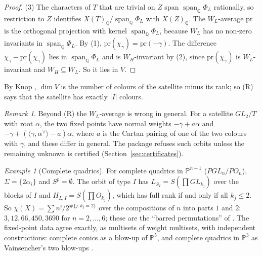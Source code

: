\documentclass[11pt]{amsart}
\theoremstyle{definition}
\theoremstyle{remark}
\newtheorem{remark}[theorem]{Remark}
\newtheorem{example}[theorem]{Example}
\newcommand{\PP}{\mathbb{P}}
\newcommand{\QQ}{\mathbb{Q}}
\newcommand{\pr}{\mathrm{pr}}
\begin{document}
\begin{proof}
(3) The characters of $T$ that are trivial on $Z$ span
$\operatorname{span}_\QQ\Phi_L$ rationally, so restriction to $Z$ identifies
$X(T)_\QQ/\operatorname{span}_\QQ\Phi_L$ with $X(Z)_\QQ$. The $W_L$-average
$\pr$ is the orthogonal projection with kernel $\operatorname{span}_\QQ\Phi_L$,
because $W_L$ has no non-zero invariants in $\operatorname{span}_\QQ\Phi_L$.
By (1), $\pr(\chi_\gamma)=\pr(-\gamma)$. The difference
$\chi_\gamma-\pr(\chi_\gamma)$ lies in $\operatorname{span}_\QQ\Phi_L$ and is
$W_H$-invariant by (2), since $\pr(\chi_\gamma)$ is $W_L$-invariant and
$W_H\subseteq W_L$. So it lies in $V$.
\end{proof}

By Knop \cite[Prop.~2.1]{KnopRoots}, $\dim V$ is the number of colours of
the satellite minus its rank; so (R) says that the satellite has exactly
$|I|$ colours.

\begin{remark}
Beyond (R) the $W_L$-average is wrong in general. For a satellite $GL_2/T$
with root $\alpha$, the two fixed points have normal weights
$-\gamma+a\alpha$ and $-\gamma+(\langle\gamma,\alpha^\vee\rangle-a)\alpha$,
where $a$ is the Cartan pairing of one of the two colours with $\gamma$,
and these differ in general. The package refuses such orbits unless the
remaining unknown is certified (Section~\ref{sec:certificates}).
\end{remark}

\begin{example}[Complete quadrics]
For complete quadrics in $\PP^{n-1}$ ($PGL_n/PO_n$), $\Sigma = \{2\alpha_i\}$
and $S^p=\emptyset$. The orbit of type $I$ has $L_{S_I}=S(\prod GL_{k_j})$
over the blocks of $I$ and $H_{L,I}=S(\prod O_{k_j})$, which has full rank
if and only if all $k_j\le 2$. So $\chi(X)=\sum n!/2^{\#\{j:k_j=2\}}$ over the
compositions of $n$ into parts $1$ and $2$: $3, 12, 66, 450, 3690$ for
$n=2,\dots,6$; these are the ``barred permutations'' of
\cite{BanerjeeCanJoyce}. The fixed-point data agree exactly, as multisets of
weight multisets, with independent constructions: complete conics as a
blow-up of $\PP^5$, and complete quadrics in $\PP^3$ as Vainsencher's two
blow-ups \cite{Vainsencher}.
\end{example}
\end{document}
